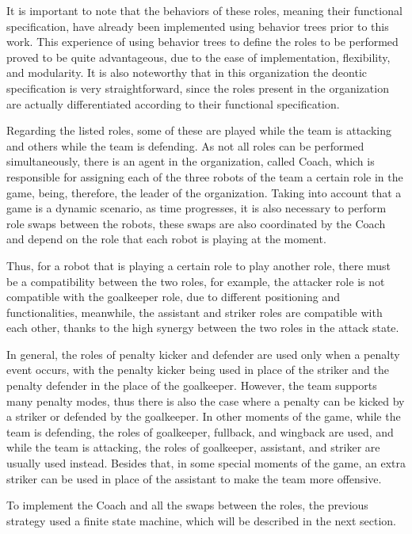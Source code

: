 It is important to note that the behaviors of these roles, meaning their functional specification, have already been implemented using behavior trees prior to this work. This experience of using behavior trees to define the roles to be performed proved to be quite advantageous, due to the ease of implementation, flexibility, and modularity. It is also noteworthy that in this organization the deontic specification is very straightforward, since the roles present in the organization are actually differentiated according to their functional specification.

Regarding the listed roles, some of these are played while the team is attacking and others while the team is defending. As not all roles can be performed simultaneously, there is an agent in the organization, called Coach, which is responsible for assigning each of the three robots of the team a certain role in the game, being, therefore, the leader of the organization. Taking into account that a game is a dynamic scenario, as time progresses, it is also necessary to perform role swaps between the robots, these swaps are also coordinated by the Coach and depend on the role that each robot is playing at the moment.

Thus, for a robot that is playing a certain role to play another role, there must be a compatibility between the two roles, for example, the attacker role is not compatible with the goalkeeper role, due to different positioning and functionalities, meanwhile, the assistant and striker roles are compatible with each other, thanks to the high synergy between the two roles in the attack state.

In general, the roles of penalty kicker and defender are used only when a penalty event occurs, with the penalty kicker being used in place of the striker and the penalty defender in the place of the goalkeeper. However, the team supports many penalty modes, thus there is also the case where a penalty can be kicked by a striker or defended by the goalkeeper. In other moments of the game, while the team is defending, the roles of goalkeeper, fullback, and wingback are used, and while the team is attacking, the roles of goalkeeper, assistant, and striker are usually used instead. Besides that, in some special moments of the game, an extra striker can be used in place of the assistant to make the team more offensive.

To implement the Coach and all the swaps between the roles, the previous strategy used a finite state machine, which will be described in the next section. 


